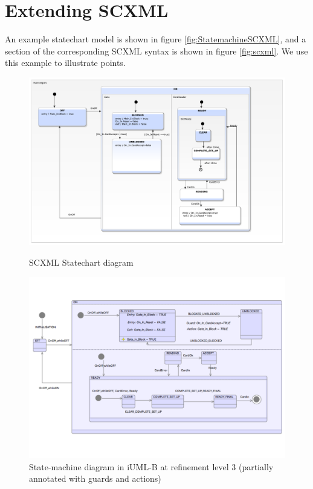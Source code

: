 
\section{Extending SCXML}
\label{sect:extension}

An example statechart model is shown in figure \ref{fig:StatemachineSCXML}, 
and a section of the corresponding SCXML syntax is shown in figure \ref{fig:scxml}. 
We use this example to illustrate points.

\begin{figure}
\begin{minipage}[]{.5\textwidth}
  \includegraphics[width=1\textwidth]{caseStudy/TurnstileSimpleModel}
  \caption{SCXML Statechart diagram}
  \label{fig:StatemachineSCXML}
\end{minipage}
\begin{minipage}[]{.5\textwidth}
  \includegraphics[width=1\textwidth]{caseStudy/TurnstileSimpleModel_iumlb}
  \caption{State-machine diagram in iUML-B at refinement level 3 (partially annotated with guards and actions)}
  \label{fig:StatemachineiUML-B}
\end{minipage}
\end{figure}

